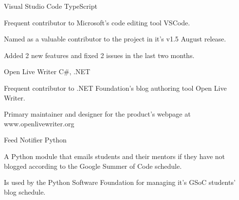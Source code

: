 
\begin{projentries}

\projentry%
  {Visual Studio Code} %
  {TypeScript} %
  {} %
  {%
    \begin{projitems} %
      \item{Frequent contributor to Microsoft's code editing tool VSCode.}
      \item{Named as a valuable contributor to the project in it's v1.5 August
            release.}
      \item{Added 2 new features and fixed 2 issues in the last two months.}
    \end{projitems}
  }

\projentry%
  {Open Live Writer} %
  {C\#, .NET} %
  {} %
  {%
    \begin{projitems} %
      \item{Frequent contributor to .NET Foundation’s blog authoring tool Open
            Live Writer.}
      \item{Primary maintainer and designer for the product's webpage at
            www.openlivewriter.org}
    \end{projitems}
  }

\projentry%
  {Feed Notifier} %
  {Python} %
  {} %
  {%
    \begin{projitems} %
      \item{A Python module that emails students and their mentors if they
            have not blogged according to the Google Summer of Code schedule.}
      \item{Is used by the Python Software Foundation for managing it's GSoC
            students' blog schedule.}
    \end{projitems}
  }


\end{projentries}
